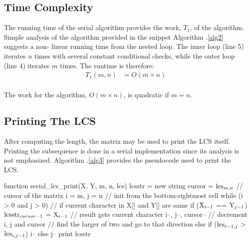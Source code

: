 \documentclass[usletter, 11pt]{extarticle}
\newcommand{\V}[1]{\textup{#1}}
\newcommand{\lcs}{\V{lcs}}
\newcommand{\seqone}{\V{X}}
\newcommand{\seqtwo}{\V{Y}}
\newcommand{\lcsstr}{\V{lcsstr}}
\begin{document}
        \subsection{Time Complexity} The running time of the serial algorithm
        provides the work, $T_{1}$, of the algorithm. Simple analysis of the
        algorithm provided in the snippet Algorithm \thesection .\ref{alg2}
        suggests a non- linear running time from the nested loop. The inner
        loop (line 5) iterates $n$ times with several constant conditional
        checks, while the outer loop (line 4) iterates $m$ times. The runtime
        is therefore:
        \begin{equation*}
            \begin{split}
                T_1(m, n) & = O(m \times n) \\
            \end{split}
        \end{equation*}

        The work for the algorithm, $O(m \times n)$, is quadratic if $m = n$.

        \subsection{Printing The LCS} After computing the length, the matrix
        may be used to print the LCS itself. Printing the subsequence is done
        in a serial implementation since its analysis is not emphasized.
        Algorithm \thesection .\ref{alg3} provides the pseudocode used to print
        the LCS.

\begin{pseudocode}[caption={Serial Longest Common Subsequence Printing},
label={alg3}]
function serial_lcs_print(X, Y, m, n, lcs)
    lcsstr = new string
    cursor = $\lcs_{m,n}$ // cursor of the matrix
    i = m, j = n // init from the bottom-rightmost cell
    while (i > 0 and j > 0)
        // if current character in X[] and Y[] are same
        if ($\seqone_{i - 1}$ == $\seqtwo_{j - 1}$)
            $\lcsstr_{cursor - 1}$ = $\seqone_{i - 1}$  // result gets current character
            i--, j--, cursor-- // decrement i, j and cursor
        // find the larger of two and go to that direction
        else if ($\lcs_{i - 1, j}$ > $\lcs_{i,j - 1}$)
            i--
        else
            j--
    print lcsstr

\end{pseudocode}
\end{document}
